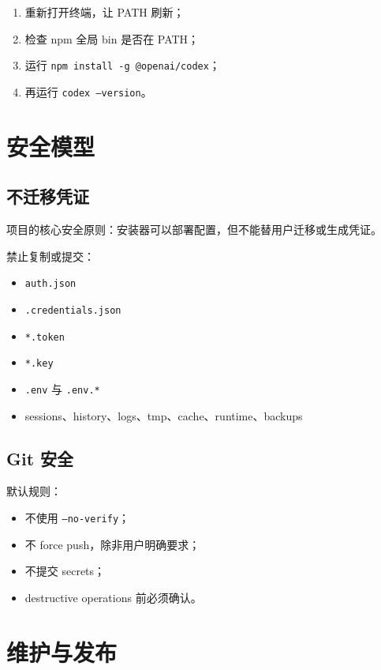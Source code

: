 \documentclass[11pt,a4paper]{ctexbook}
\begin{document}
\begin{enumerate}[leftmargin=2em]
  \item 重新打开终端，让 PATH 刷新；
  \item 检查 npm 全局 bin 是否在 PATH；
  \item 运行 \texttt{npm install -g @openai/codex}；
  \item 再运行 \texttt{codex --version}。
\end{enumerate}

\chapter{安全模型}

\section{不迁移凭证}

项目的核心安全原则：安装器可以部署配置，但不能替用户迁移或生成凭证。

禁止复制或提交：

\begin{itemize}[leftmargin=2em]
  \item \texttt{auth.json}
  \item \texttt{.credentials.json}
  \item \texttt{*.token}
  \item \texttt{*.key}
  \item \texttt{.env} 与 \texttt{.env.*}
  \item sessions、history、logs、tmp、cache、runtime、backups
\end{itemize}

\section{Git 安全}

默认规则：

\begin{itemize}[leftmargin=2em]
  \item 不使用 \texttt{--no-verify}；
  \item 不 force push，除非用户明确要求；
  \item 不提交 secrets；
  \item destructive operations 前必须确认。
\end{itemize}

\chapter{维护与发布}
\end{document}
